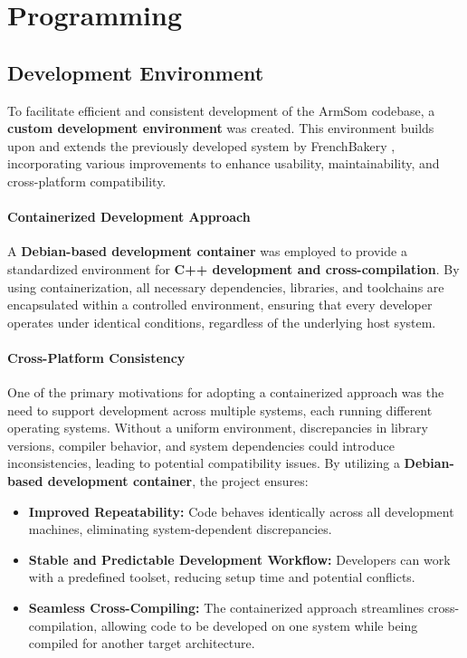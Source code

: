 
\section{Programming}
\subsection{Development Environment}  

To facilitate efficient and consistent development of the ArmSom codebase, a \textbf{custom development environment} was created. This environment builds upon and extends the previously developed system by FrenchBakery \cite{fb_dev_environment}, incorporating various improvements to enhance usability, maintainability, and cross-platform compatibility.  

\paragraph{Containerized Development Approach}  
A \textbf{Debian-based development container} was employed to provide a standardized environment for \textbf{C++ development and cross-compilation}. By using containerization, all necessary dependencies, libraries, and toolchains are encapsulated within a controlled environment, ensuring that every developer operates under identical conditions, regardless of the underlying host system.  

\paragraph{Cross-Platform Consistency}  
One of the primary motivations for adopting a containerized approach was the need to support development across multiple systems, each running different operating systems. Without a uniform environment, discrepancies in library versions, compiler behavior, and system dependencies could introduce inconsistencies, leading to potential compatibility issues. By utilizing a \textbf{Debian-based development container}, the project ensures:  
\begin{itemize}  
	\item \textbf{Improved Repeatability:} Code behaves identically across all development machines, eliminating system-dependent discrepancies.  
	\item \textbf{Stable and Predictable Development Workflow:} Developers can work with a predefined toolset, reducing setup time and potential conflicts.  
	\item \textbf{Seamless Cross-Compiling:} The containerized approach streamlines cross-compilation, allowing code to be developed on one system while being compiled for another target architecture.  
\end{itemize}  

